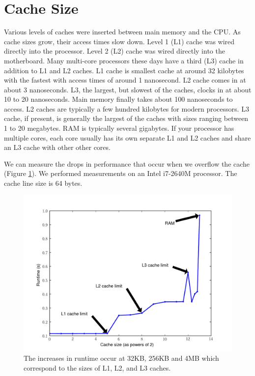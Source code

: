 \section*{Cache Size}
Various levels of caches were inserted between main memory and the CPU.  
As cache sizes grow, their access times slow down.
Level 1 (L1) cache was wired directly into the processor.  Level 2 (L2) cache was wired directly into the motherboard.  
Many multi-core processors these days have a third (L3) cache in addition to L1 and L2 caches.  
L1 cache is smallest cache at around 32 kilobytes with the fastest with access times of around 1 nanosecond.  
L2 cache comes in at about 3 nanoseconds.  L3, the largest, but slowest of the caches, clocks in at about 10 to 20 nanoseconds. 
Main memory finally takes about 100 nanoseconds to access.  L2 caches are typically a few hundred kilobytes for modern processors. 
L3 cache, if present, is generally the largest of the caches with sizes ranging between 1 to 20 megabytes. 
RAM is typically several gigabytes.  If your processor has multiple cores, each core usually has its own separate L1 and L2 caches and share an L3 cache with other other cores.

We can measure the drops in performance that occur when we overflow the cache (Figure \ref{fig:cachesizes}).
We performed measurements on an Intel i7-2640M processor.  The cache line size is 64 bytes.
\begin{figure}[h]
\centering
\includegraphics[width=\textwidth]{cache_size.pdf}
\caption{The increases in runtime occur at 32KB, 256KB and 4MB which correspond to the sizes of L1, L2, and L3 caches.}
\label{fig:cachesizes}
\end{figure}

